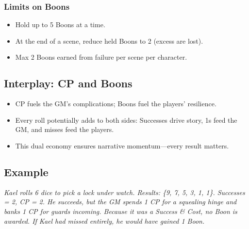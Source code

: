\subsubsection{Limits on Boons}
\begin{itemize}
  \item Hold up to 5 Boons at a time.
  \item At the end of a scene, reduce held Boons to 2 (excess are lost).
  \item Max 2 Boons earned from failure per scene per character.
\end{itemize}

\subsection{Interplay: CP and Boons}
\begin{itemize}
  \item CP fuels the GM’s complications; Boons fuel the players’ resilience.
  \item Every roll potentially adds to both sides: Successes drive story, 1s feed the GM, and misses feed the players.
  \item This dual economy ensures narrative momentum—every result matters.
\end{itemize}

\subsection{Example}
\emph{Kael rolls 6 dice to pick a lock under watch. Results: \{9, 7, 5, 3, 1, 1\}. Successes = 2, CP = 2. He succeeds, but the GM spends 1 CP for a squealing hinge and banks 1 CP for guards incoming. Because it was a Success \& Cost, no Boon is awarded. If Kael had missed entirely, he would have gained 1 Boon.}
